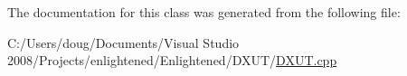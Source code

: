 The documentation for this class was generated from the following file:\begin{DoxyCompactItemize}
\item 
C:/Users/doug/Documents/Visual Studio 2008/Projects/enlightened/Enlightened/DXUT/\hyperlink{_d_x_u_t_8cpp}{DXUT.cpp}\end{DoxyCompactItemize}
